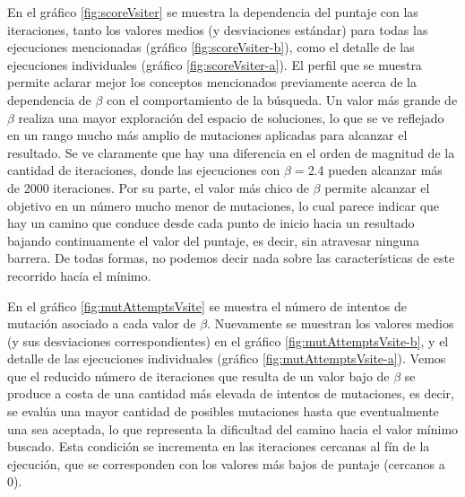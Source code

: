 En el gráfico \ref{fig:scoreVsiter} se muestra la dependencia del puntaje con las iteraciones, tanto los valores medios (y desviaciones estándar) para todas las ejecuciones mencionadas (gráfico \ref{fig:scoreVsiter-b}), 
como el detalle de las ejecuciones individuales (gráfico \ref{fig:scoreVsiter-a}).
El perfil que se muestra permite aclarar mejor los conceptos mencionados previamente acerca de la dependencia de $\beta$ con el comportamiento de la búsqueda. 
Un valor más grande de $\beta$ realiza una mayor exploración del espacio de soluciones, lo que se ve reflejado en un rango mucho más amplio de mutaciones aplicadas para alcanzar el resultado.
Se ve claramente que hay una diferencia en el orden de magnitud de la cantidad de iteraciones, donde las ejecuciones con $\beta=$2.4 pueden alcanzar más de 2000 iteraciones.
Por su parte, el valor más chico de $\beta$ permite alcanzar el objetivo en un número mucho menor de mutaciones, lo cual parece indicar que hay un camino 
que conduce desde cada punto de inicio hacia un resultado bajando continuamente el valor del puntaje, es decir, sin atravesar ninguna barrera.
De todas formas, no podemos decir nada sobre las características de este recorrido hacía el mínimo.

En el gráfico \ref{fig:mutAttemptsVsite} se muestra el número de intentos de mutación asociado a cada valor de $\beta$.
Nuevamente se muestran los valores medios (y sus desviaciones correspondientes) en el gráfico \ref{fig:mutAttemptsVsite-b}, y el detalle de las ejecuciones individuales (gráfico \ref{fig:mutAttemptsVsite-a}).
Vemos que el reducido número de iteraciones que resulta de un valor bajo de $\beta$ se produce a costa de una cantidad más elevada de intentos de mutaciones, es decir, se evalúa una mayor cantidad de posibles mutaciones hasta 
que eventualmente una sea aceptada, lo que representa la dificultad del camino hacia el valor mínimo buscado. 
Esta condición se incrementa en las iteraciones cercanas al fín de la ejecución, que se corresponden con los valores más bajos de puntaje (cercanos a 0). 





